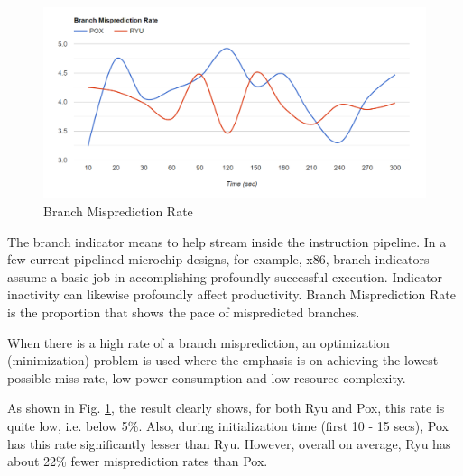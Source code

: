 \begin{figure}[!hbt]
    \centering
        \includegraphics[width=\textwidth,keepaspectratio]{images/branch_mispredicted.png}
       \caption{Branch Misprediction Rate}
        \label{branchmisprediction}
\end{figure}
The branch indicator means to help stream inside the instruction pipeline. In a few current pipelined microchip designs, for example, x86, branch indicators assume a basic job in accomplishing profoundly successful execution. Indicator inactivity can likewise profoundly affect productivity. Branch Misprediction Rate is the proportion that shows the pace of mispredicted branches.

When there is a high rate of a branch misprediction, an optimization (minimization) problem is used where the
emphasis is on achieving the lowest possible miss rate, low power consumption and low resource complexity. 

As shown in Fig. \ref{branchmisprediction}, the result clearly shows, for both Ryu and Pox, this rate is quite low, i.e. below 5\%. Also, during initialization time (first 10 - 15 secs), Pox has this rate significantly lesser than Ryu. However, overall on average, Ryu has about 22\% fewer misprediction rates than Pox.